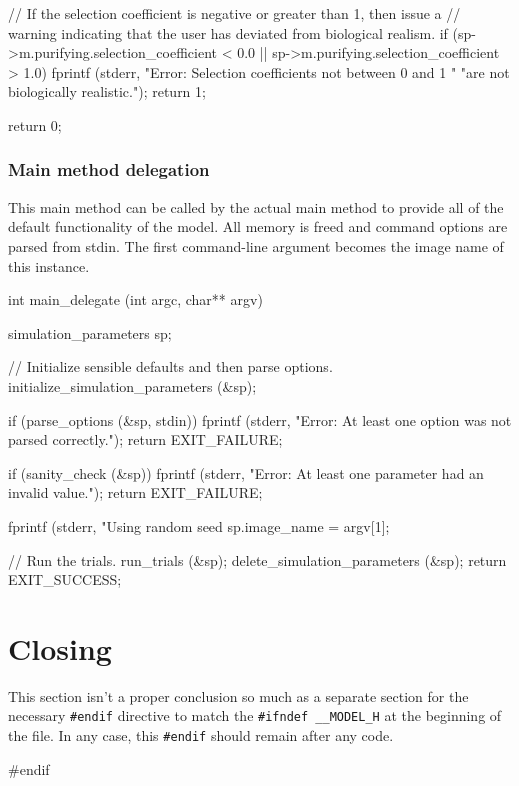 \documentclass{article}
\begin{document}
\begin{ccode}
{  // If the selection coefficient is negative or greater than 1, then issue a
  // warning indicating that the user has deviated from biological realism.
  if (sp->m.purifying.selection_coefficient < 0.0 ||
      sp->m.purifying.selection_coefficient > 1.0) {
    fprintf (stderr, "Error: Selection coefficients not between 0 and 1 "
		     "are not biologically realistic.\n");
    return 1;
  }

  return 0;
}
\end{ccode}

      \subsubsection{Main method delegation}
	\label{sec:main-method-delegation}

	This main method can be called by the actual main method to provide all
	of the default functionality of the model. All memory is freed and
	command options are parsed from stdin. The first command-line argument
	becomes the image name of this instance.

\begin{ccode}
int main_delegate (int argc, char** argv) {
  simulation_parameters sp;

  // Initialize sensible defaults and then parse options.
  initialize_simulation_parameters (&sp);

  if (parse_options (&sp, stdin)) {
    fprintf (stderr, "Error: At least one option was not parsed correctly.\n");
    return EXIT_FAILURE;
  }

  if (sanity_check (&sp)) {
    fprintf (stderr, "Error: At least one parameter had an invalid value.\n");
    return EXIT_FAILURE;
  }

  fprintf (stderr, "Using random seed %
  sp.image_name = argv[1];

  // Run the trials.
  run_trials (&sp);
  delete_simulation_parameters (&sp);
  return EXIT_SUCCESS;
}
\end{ccode}

  \section{Closing}

    This section isn't a proper conclusion so much as a separate section for the
    necessary \verb|#endif| directive to match the \verb|#ifndef __MODEL_H| at the beginning
    of the file. In any case, this \verb|#endif| should remain after any code.

\begin{ccode}
#endif
\end{ccode}
\end{document}
